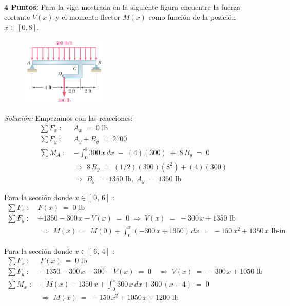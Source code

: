 \documentclass[ a4paper, twoside, 11pt]{article}
\begin{document}
\begin{problem}
\textbf{4 Puntos:} Para la viga mostrada en la siguiente figura encuentre la fuerza cortante $V(x)$ y el momento flector $M(x)$ como funci\'on de la posici\'on $x \in [0,8]$. 

\begin{figure}[htb]
\centering
\includegraphics[width=0.36\textwidth]{prob-vigas.jpg}
\end{figure}

\emph{Soluci\'on:} Empezamos con las reacciones: 
\begin{align*}
\sum F_x \; \colon \; & A_x \; = \; 0 \text{ lb} \\[1ex]
\sum F_y \; \colon \; & A_y + B_y \; = \; 2700 \\[1ex]
\sum M_A \; \colon \;
& - \int_0^8 300 \, x \, dx \; - \; (4)(300) \; + \; 8 \, B_y \; = \; 0 \\[1ex]
& \Longrightarrow \; 8 \, B_y \; = \; (1/2)(300)(8^2) + (4)(300) \\[1ex]
& \Longrightarrow \; B_y \; = \; 1350 \text{ lb}, \; A_y \; = \; 1350 \text{ lb}
\end{align*}

Para la secci\'on donde $x \in [ \, 0, \, 6]$ :
\begin{align*}
\sum F_x \; \colon \; & F(x) \; = \; 0 \text{ lb} \\[1ex]
\sum F_y \; \colon \;
& +1350 - 300 \, x - V(x) \; = \; 0
\; \Longrightarrow \;
V(x) \; = \; -300 \, x + 1350 \text{ lb} \\[1ex]
& \; \Longrightarrow \;
M(x) \; = \; M(0) + \int_{0}^x ( -300 \, x + 1350) \, dx
\; = \; - 150 \, x^2 + 1350 \, x \text{ lb-in}
\end{align*}

Para la secci\'on donde $x \in [ \, 6, \, 4]$ :
\begin{align*}
\sum F_x \; \colon \; & F(x) \; = \; 0 \text{ lb} \\[1ex]
\sum F_y \; \colon \;
& +1350 - 300 \, x - 300 - V(x) \; = \; 0
\quad \Longrightarrow \;
V(x) \; = \; -300 \, x + 1050 \text{ lb} \\[1ex]
\sum M_x \; \colon \;
& +M(x) - 1350 \, x + \int_0^x 300 \, x \, dx + 300 \, (x-4) \; = \; 0 \\[1ex]
& \Longrightarrow \;
M(x) \; = \; - 150 \, x^2 + 1050 \, x + 1200 \text{ lb}
\end{align*}


\end{problem}
\end{document}
